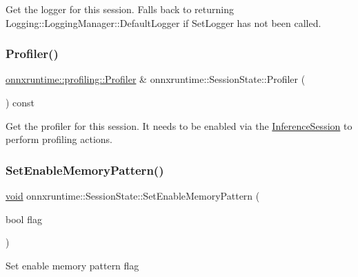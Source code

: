 Get the logger for this session. Falls back to returning Logging\+::\+Logging\+Manager\+::\+Default\+Logger if Set\+Logger has not been called. \mbox{\label{classonnxruntime_1_1SessionState_ab7485b490fd94087096dcb7768bca814}} 
\subsubsection{\texorpdfstring{Profiler()}{Profiler()}}
{\footnotesize\ttfamily \mbox{\hyperlink{classonnxruntime_1_1profiling_1_1Profiler}{onnxruntime\+::profiling\+::\+Profiler}} \& onnxruntime\+::\+Session\+State\+::\+Profiler (\begin{DoxyParamCaption}{ }\end{DoxyParamCaption}) const}

Get the profiler for this session. It needs to be enabled via the \mbox{\hyperlink{classonnxruntime_1_1InferenceSession}{Inference\+Session}} to perform profiling actions. \mbox{\label{classonnxruntime_1_1SessionState_af01f42ff9a4cbb027a914179e5d7a8b8}} 
\subsubsection{\texorpdfstring{Set\+Enable\+Memory\+Pattern()}{SetEnableMemoryPattern()}}
{\footnotesize\ttfamily \mbox{\hyperlink{mlasi_8h_a88f941d423cb2a819b70a1358982b1a6}{void}} onnxruntime\+::\+Session\+State\+::\+Set\+Enable\+Memory\+Pattern (\begin{DoxyParamCaption}\item[{bool}]{flag }\end{DoxyParamCaption})}

Set enable memory pattern flag \mbox{\label{classonnxruntime_1_1SessionState_a3f028fc934024bfefa2de97c9616f325}} 
